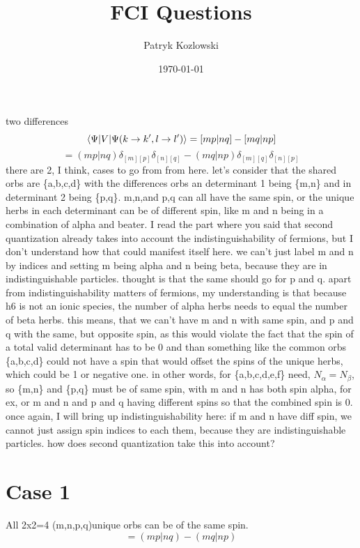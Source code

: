 \documentclass[12pt]{article}
\title{FCI Questions}
\author{Patryk Kozlowski}
\date{\today}
\begin{document}
\maketitle
two differences
\begin{equation}
    \mel{\Psi }{V}{\Psi (k\rightarrow k^{\prime}, l\rightarrow l^{\prime})}
    =[mp|nq]-[mq|np]
\end{equation}
\begin{equation}
    =(mp|nq)\delta _{[m][p]}\delta _{[n][q]}-(mq|np)\delta _{[m][q]}\delta _{[n][p]}
\end{equation}
 there are 2, I think, cases to go from from here. let's consider that the shared orbs are \{a,b,c,d\} with the differences orbs an determinant 1 being \{m,n\} and in determinant 2 being \{p,q\}. m,n,and p,q can all have the same spin, or the unique herbs in each determinant can be of different spin, like m and n being in a combination of alpha and beater. I read the part where you said that second quantization already takes into account the indistinguishability of fermions, but I don't understand how that could manifest itself here. we can't just label m and n by indices and setting m being alpha and n being beta, because they are in indistinguishable particles. thought is that the same should go for p and q. apart from indistinguishability matters of fermions, my understanding is that because h6 is not an ionic species, the number of alpha herbs needs to equal the number of beta herbs. this means, that we can't have m and n with same spin, and p and q with the same, but opposite spin, as this would violate the fact that the spin of a total valid determinant has to be 0 and than something like the common orbs \{a,b,c,d\} could not have a spin that would offset the spins of the unique herbs, which could be 1 or negative one. in other words, for \{a,b,c,d,e,f\} need, $N_{\alpha }=N_{\beta }$, so \{m,n\} and \{p,q\} must be of same spin, with m and n has both spin alpha, for ex, or m and n and p and q having different spins so that the combined spin is 0. once again, I will bring up indistinguishability here: if m and n have diff spin, we cannot just assign spin indices to each them, because they are indistinguishable particles. how does second quantization take this into account? 
\section{Case 1}
All 2x2=4 (m,n,p,q)unique orbs can be of the same spin.
\begin{equation}
    =(mp|nq)-(mq|np)
\end{equation}
\end{document}
